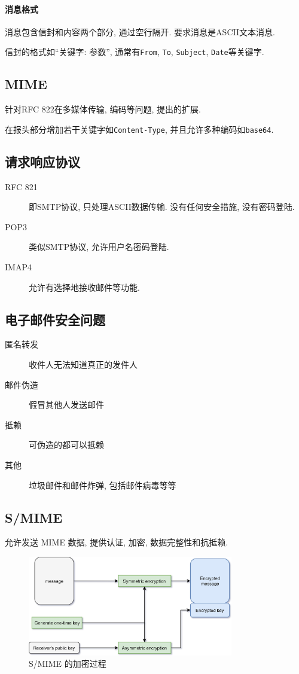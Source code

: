 \documentclass{ctexart}
\begin{document}
\paragraph{消息格式} 消息包含信封和内容两个部分, 通过空行隔开. 要求消息是ASCII文本消息.\par
    信封的格式如``关键字: 参数'', 通常有\verb/From/, \verb/To/, \verb/Subject/, \verb/Date/等关键字.
\subsection{MIME}
    针对RFC 822在多媒体传输, 编码等问题, 提出的扩展.\par
    在报头部分增加若干关键字如\verb/Content-Type/, 并且允许多种编码如\verb/base64/.
\subsection{请求响应协议} \begin{description}
        \item[RFC 821] 即SMTP协议, 只处理ASCII数据传输. 没有任何安全措施, 没有密码登陆.
        \item[POP3] 类似SMTP协议, 允许用户名密码登陆.
        \item[IMAP4] 允许有选择地接收邮件等功能.
    \end{description}
\subsection{电子邮件安全问题}
    \begin{description}
        \item[匿名转发] 收件人无法知道真正的发件人
        \item[邮件伪造] 假冒其他人发送邮件
        \item[抵赖] 可伪造的都可以抵赖
        \item[其他] 垃圾邮件和邮件炸弹, 包括邮件病毒等等
    \end{description}
\subsection{S/MIME}
    允许发送 MIME 数据, 提供认证, 加密, 数据完整性和抗抵赖.

    \begin{figure}[ht!]
    \centering
    \includegraphics[height=0.5\textheight,width=0.8\textwidth,keepaspectratio]{s-mime-enc.jpg}
    \caption{S/MIME 的加密过程}
    \label{s-mime-enc}
    \end{figure}
\end{document}
